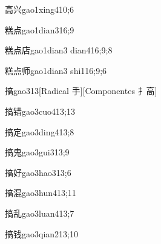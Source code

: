 \begin{verbete}{高兴}{gao1xing4}{10;6}
\end{verbete}

\begin{verbete}{糕点}{gao1dian3}{16;9}
\end{verbete}

\begin{verbete}{糕点店}{gao1dian3 dian4}{16;9;8}
\end{verbete}

\begin{verbete}{糕点师}{gao1dian3 shi1}{16;9;6}
\end{verbete}

\begin{verbete}{搞}{gao3}{13}[Radical 手][Componentes ⺘⾼]
\end{verbete}

\begin{verbete}{搞错}{gao3cuo4}{13;13}
\end{verbete}

\begin{verbete}{搞定}{gao3ding4}{13;8}
\end{verbete}

\begin{verbete}{搞鬼}{gao3gui3}{13;9}
\end{verbete}

\begin{verbete}{搞好}{gao3hao3}{13;6}
\end{verbete}

\begin{verbete}{搞混}{gao3hun4}{13;11}
\end{verbete}

\begin{verbete}{搞乱}{gao3luan4}{13;7}
\end{verbete}

\begin{verbete}{搞钱}{gao3qian2}{13;10}
\end{verbete}

